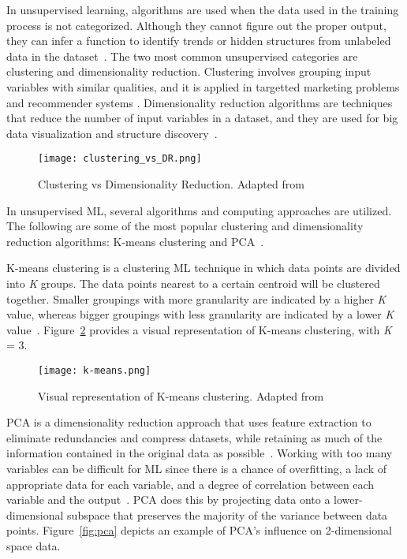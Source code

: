 In unsupervised learning, algorithms are used when the data used in the training process is not categorized. Although they cannot figure out the proper output, they can infer a function to identify trends or hidden structures from unlabeled data in the dataset~\cite{Karazi2019StatisticalProcess-Review}. The two most common unsupervised categories are clustering and dimensionality reduction. Clustering involves grouping input variables with similar qualities, and it is applied in targetted marketing problems and recommender systems \cite{Omran2007AnMethods}. Dimensionality reduction algorithms are techniques that reduce the number of input variables in a dataset, and they are used for big data visualization and structure discovery~\cite{VanDerMaaten2009DimensionalityComparative}. 
    
    \begin{figure}[htbp]
        \centering
        \texttt{[image: clustering\_vs\_DR.png]}
        \caption{Clustering vs Dimensionality Reduction. Adapted from~\cite{Beck2020AModelling}}
        \label{fig:clustering_vs_DR}
    \end{figure}

In unsupervised \gls{ML}, several algorithms and computing approaches are utilized. The following are some of the most popular clustering and dimensionality reduction algorithms: K-means clustering and \gls{PCA}~\cite{Chugh2018TypesKnow}.

K-means clustering is a clustering \gls{ML} technique in which data points are divided into \textit{K} groups. The data points nearest to a certain centroid will be clustered together. Smaller groupings with more granularity are indicated by a higher \textit{K} value, whereas bigger groupings with less granularity are indicated by a lower \textit{K} value~\cite{2020WhatIBMb}. Figure~\ref{fig:k_means} provides a visual representation of K-means clustering, with \textit{K} = 3. 
    
\begin{figure}[htbp]
    \centering
    \texttt{[image: k-means.png]}
    \caption{Visual representation of K-means clustering. Adapted from~\cite{Beaumont2020ImageMedium}}
    \label{fig:k_means}
\end{figure}

\gls{PCA} is a dimensionality reduction approach that uses feature extraction to eliminate redundancies and compress datasets, while retaining as much of the information contained in the original data as possible~\cite{2020WhatIBMb}. Working with too many variables can be difficult for \gls{ML} since there is a chance of overfitting, a lack of appropriate data for each variable, and a degree of correlation between each variable and the output~\cite{Chugh2018TypesKnow}. \gls{PCA} does this by projecting data onto a lower-dimensional subspace that preserves the majority of the variance between data points. Figure~\ref{fig:pca} depicts an example of \gls{PCA}'s influence on 2-dimensional space data.

